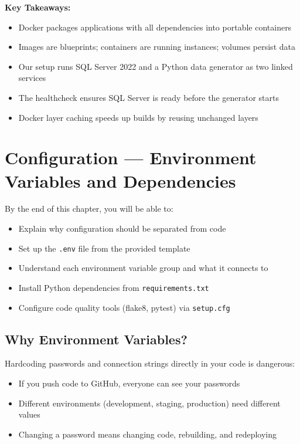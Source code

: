 \documentclass[12pt, a4paper, oneside]{report}
\begin{document}
\begin{summarybox}
\textbf{Key Takeaways:}
\begin{itemize}
    \item Docker packages applications with all dependencies into portable containers
    \item Images are blueprints; containers are running instances; volumes persist data
    \item Our setup runs SQL Server 2022 and a Python data generator as two linked services
    \item The healthcheck ensures SQL Server is ready before the generator starts
    \item Docker layer caching speeds up builds by reusing unchanged layers
\end{itemize}
\end{summarybox}


\chapter{Configuration --- Environment Variables and Dependencies}
\label{ch:config}

\begin{objectivebox}
By the end of this chapter, you will be able to:
\begin{itemize}
    \item Explain why configuration should be separated from code
    \item Set up the \texttt{.env} file from the provided template
    \item Understand each environment variable group and what it connects to
    \item Install Python dependencies from \texttt{requirements.txt}
    \item Configure code quality tools (flake8, pytest) via \texttt{setup.cfg}
\end{itemize}
\end{objectivebox}

\section{Why Environment Variables?}

Hardcoding passwords and connection strings directly in your code is dangerous:
\begin{itemize}
    \item If you push code to GitHub, everyone can see your passwords
    \item Different environments (development, staging, production) need different values
    \item Changing a password means changing code, rebuilding, and redeploying
\end{itemize}
\end{document}
